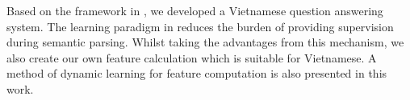 Based on the framework in \cite{Clarke:2010:DSP:1870568.1870571}, we developed a Vietnamese question answering system. The learning paradigm in \cite{Clarke:2010:DSP:1870568.1870571} reduces the burden of providing supervision during semantic parsing. Whilst taking the advantages from this mechanism, we also create our own feature calculation which is suitable for Vietnamese. A method of dynamic learning for feature computation is also presented in this work.